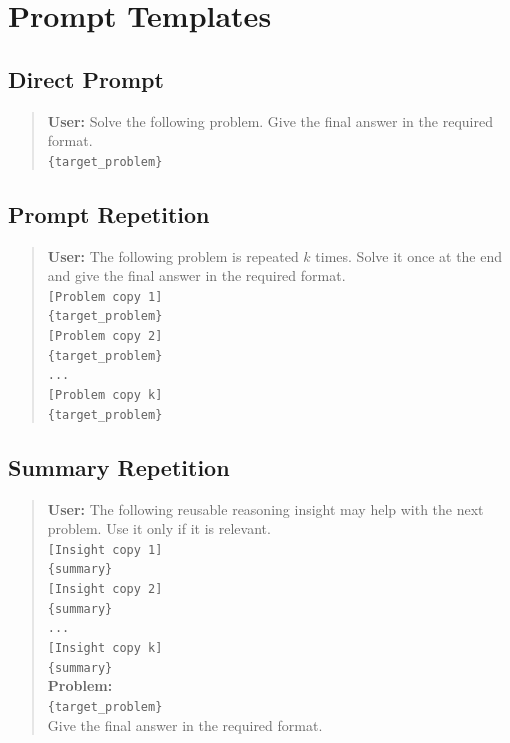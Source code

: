 \section{Prompt Templates}
\label{app:prompt-templates}

\subsection{Direct Prompt}

\begin{quote}
\textbf{User:} Solve the following problem. Give the final answer in the required format.\\
\texttt{\{target\_problem\}}
\end{quote}

\subsection{Prompt Repetition}

\begin{quote}
\textbf{User:} The following problem is repeated $k$ times. Solve it once at the end and give the final answer in the required format.\\
\texttt{[Problem copy 1]}\\
\texttt{\{target\_problem\}}\\
\texttt{[Problem copy 2]}\\
\texttt{\{target\_problem\}}\\
\texttt{...}\\
\texttt{[Problem copy k]}\\
\texttt{\{target\_problem\}}
\end{quote}

\subsection{Summary Repetition}

\begin{quote}
\textbf{User:} The following reusable reasoning insight may help with the next problem. Use it only if it is relevant.\\
\texttt{[Insight copy 1]}\\
\texttt{\{summary\}}\\
\texttt{[Insight copy 2]}\\
\texttt{\{summary\}}\\
\texttt{...}\\
\texttt{[Insight copy k]}\\
\texttt{\{summary\}}\\
\textbf{Problem:}\\
\texttt{\{target\_problem\}}\\
Give the final answer in the required format.
\end{quote}

